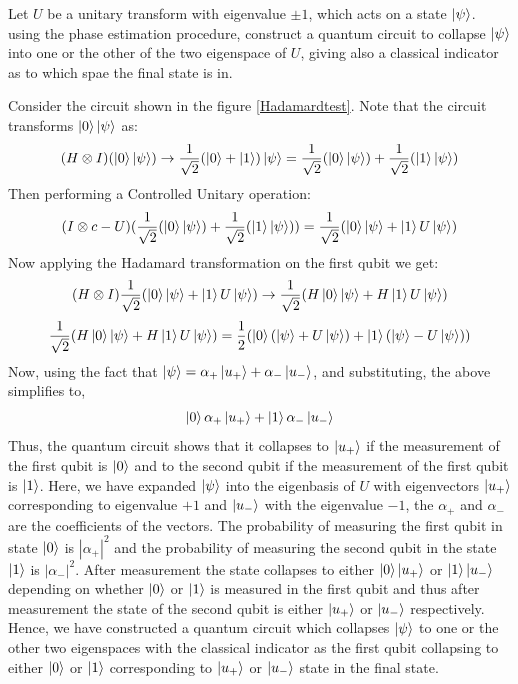 \begin{example}
    Let $U$ be a unitary transform with eigenvalue $\pm1$, which acts on a state $\ket{\psi}$. using the phase estimation procedure, construct a quantum circuit to collapse $\ket{\psi}$ into one or the other of the two eigenspace of $U$, giving also a classical indicator as to which spae the final state is in.

    Consider the circuit shown in the figure \ref{Hadamardtest}.
    Note that the circuit transforms $\ket{0}\ket{\psi}$ as:
\[
(H\otimes I)(\ket{0}\ket{\psi})\rightarrow \frac{1}{\sqrt{2}}(\ket{0}+\ket{1})\ket{\psi}=\frac{1}{\sqrt{2}}(\ket{0}\ket{\psi}) +\frac{1}{\sqrt{2}}(\ket{1}\ket{\psi})
\]
Then performing a Controlled Unitary operation:
\[
(I\otimes c-U)(\frac{1}{\sqrt{2}}(\ket{0}\ket{\psi}) +\frac{1}{\sqrt{2}}(\ket{1}\ket{\psi}))=\frac{1}{\sqrt{2}}(\ket{0}\ket{\psi}+\ket{1}U\ket{\psi})
\]
Now applying the Hadamard transformation on the first qubit we get:
\[
(H\otimes I)\frac{1}{\sqrt{2}}(\ket{0}\ket{\psi}+\ket{1}U\ket{\psi})\rightarrow \frac{1}{\sqrt{2}}(H\ket{0}\ket{\psi}+H\ket{1}U\ket{\psi})
\]
\[
    \frac{1}{\sqrt{2}}(H\ket{0}\ket{\psi}+H\ket{1}U\ket{\psi})=\frac{1}{2}(\ket{0}(\ket{\psi}+U\ket{\psi})+\ket{1}(\ket{\psi}-U\ket{\psi}))
\]
Now, using the fact that $\ket{\psi}=\alpha_{+} \ket{u_+} +\alpha_- \ket{u_-}$, and substituting, the above simplifies to,
\[
\ket{0}\alpha_+\ket{u_+} + \ket{1}\alpha_-\ket{u_-}
\]
Thus, the quantum circuit shows that it collapses to $\ket{u_+}$ if the measurement of the first qubit is $\ket{0}$ and to the second qubit if the measurement of the first qubit is $\ket{1}$. Here, we have expanded $\ket{\psi}$ into the eigenbasis of $U$ with eigenvectors $\ket{u_+}$ corresponding to eigenvalue $+1$ and $\ket{u_-}$ with the eigenvalue $-1$, the $\alpha_+$ and $\alpha_-$ are the coefficients of the vectors. The probability of measuring the first qubit in state $\ket{0}$ is $|\alpha_+|^2$ and the probability of measuring the second qubit in the state $\ket{1}$ is $|\alpha_-|^2$. After measurement the state collapses to either $\ket{0}\ket{u_+}$ or $\ket{1}\ket{u_-}$ depending on whether $\ket{0}$ or $\ket{1}$ is measured in the first qubit and thus after measurement the state of the second qubit is either $\ket{u_+}$ or $\ket{u_-}$ respectively. Hence, we have constructed a quantum circuit which collapses $\ket{\psi}$ to one or the other two eigenspaces with the classical indicator as the first qubit collapsing to either $\ket{0}$ or $\ket{1}$ corresponding to $\ket{u_+}$ or $\ket{u_-}$ state in the final state.
\end{example}
